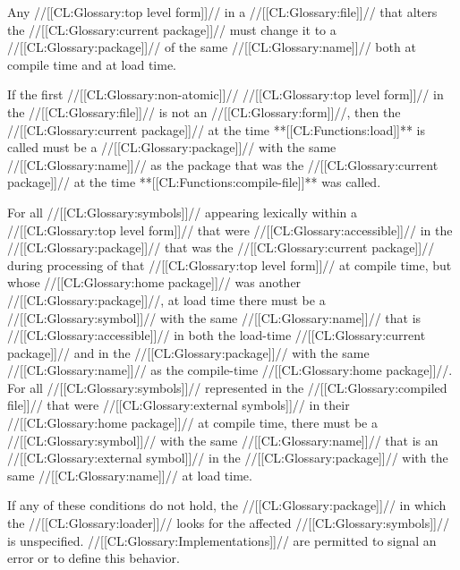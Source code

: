 \beginlist

 Any //[[CL:Glossary:top level form]]// in a //[[CL:Glossary:file]]// that alters 	  the //[[CL:Glossary:current package]]// must change it to a //[[CL:Glossary:package]]// 	  of the same //[[CL:Glossary:name]]// both at compile time and at load time.

 If the first //[[CL:Glossary:non-atomic]]// //[[CL:Glossary:top level form]]// in the //[[CL:Glossary:file]]// 	  is not an  //[[CL:Glossary:form]]//, then the //[[CL:Glossary:current package]]// 	  at the time **[[CL:Functions:load]]** is called must be a //[[CL:Glossary:package]]// with the  	  same //[[CL:Glossary:name]]// as the package that was the //[[CL:Glossary:current package]]// 	  at the time **[[CL:Functions:compile-file]]** was called. \endlist

 For all //[[CL:Glossary:symbols]]// 
      appearing lexically within a //[[CL:Glossary:top level form]]// that
      were //[[CL:Glossary:accessible]]// in the //[[CL:Glossary:package]]// that was the //[[CL:Glossary:current package]]//
      during processing of that //[[CL:Glossary:top level form]]// at compile time, but
      whose //[[CL:Glossary:home package]]// was another //[[CL:Glossary:package]]//, at load time there must
      be a //[[CL:Glossary:symbol]]// with the same //[[CL:Glossary:name]]// that is //[[CL:Glossary:accessible]]// in both the
      load-time //[[CL:Glossary:current package]]// and in the //[[CL:Glossary:package]]//
      with the same //[[CL:Glossary:name]]// as the
      compile-time //[[CL:Glossary:home package]]//. 
    For all //[[CL:Glossary:symbols]]// represented in the //[[CL:Glossary:compiled file]]// 
      that were //[[CL:Glossary:external symbols]]// in
      their //[[CL:Glossary:home package]]// at compile time, there must be a //[[CL:Glossary:symbol]]// with the
      same //[[CL:Glossary:name]]// that is an //[[CL:Glossary:external symbol]]// in the //[[CL:Glossary:package]]// 
      with the same //[[CL:Glossary:name]]// at load time. \endlist
        
  If any of these conditions do not hold, the //[[CL:Glossary:package]]// in which the //[[CL:Glossary:loader]]// looks
  for the affected //[[CL:Glossary:symbols]]// is unspecified.  //[[CL:Glossary:Implementations]]// are permitted 
  to signal an error or to define this behavior.

\endlist

\endsubsubsection%

